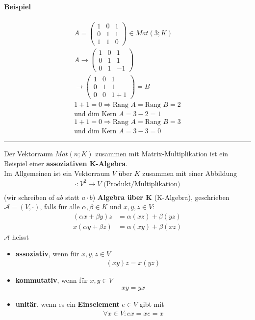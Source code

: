 \documentclass[11pt]{report}
\newcommand*\f[1] {\textbf{#1}}
\begin{document}
\paragraph{Beispiel}

\begin{align}
 A = \begin{pmatrix}  1 & 0 & 1 \\ 0 & 1 & 1 \\ 1 & 1 & 0\end{pmatrix} \in Mat(3;K) \\
 A \rightarrow \begin{pmatrix}  1 & 0 & 1 \\ 0 & 1 & 1 \\ 0 & 1 & -1\end{pmatrix}\\
\rightarrow \begin{pmatrix}  1 & 0 & 1 \\ 0 & 1 & 1 \\ 0 & 0 & 1+1\end{pmatrix} = B \\
1 + 1 = 0 \Rightarrow \text{Rang } A = \text{Rang } B = 2\\
\text{und dim Kern } A = 3-2 = 1 \\
1 + 1 = 0 \Rightarrow \text{Rang } A = \text{Rang } B = 3\\
\text{und dim Kern } A = 3-3 = 0 
\end{align}
\vspace*{0.2cm}\rule{\linewidth}{0.3mm}\vspace{0.2cm}
Der Vektorraum $Mat(n;K)$ zusammen mit Matrix-Multiplikation ist ein Beispiel einer \f{assoziativen K-Algebra}. \\
Im Allgemeinen ist ein Vektorraum $V$ über $K$ zusammen mit einer Abbildung
\begin{align}
 \cdot : V^2 \rightarrow V \text{ (Produkt/Multiplikation)} \\
\end{align}
(wir schreiben of $ab$ statt $a \cdot b$) \f{Algebra über K} (K-Algebra), geschrieben $\mathcal{A} = (V,\cdot)$, falls für alle $\alpha, \beta \in K$ und $x,y,z \in V:$
\begin{align}
(\alpha x + \beta y) z &= \alpha(xz) + \beta (yz) \\
x(\alpha y + \beta z) &= \alpha(xy) + \beta(xz)
\end{align}
\newpage
$\mathcal{A}$ heisst
\begin{itemize}
 \item \f{assoziativ}, wenn für $x,y,z \in V$
\begin{align}
 (xy)z = x(yz)
\end{align}
\item \f{kommutativ}, wenn für $x,y \in V$
\begin{align}
 xy = yx
\end{align}
\item \f{unitär}, wenn es ein \f{Einselement} $e \in V$ gibt mit 
\begin{align}
\forall x \in V: ex = xe = x 
\end{align}
\end{itemize}
\end{document}
